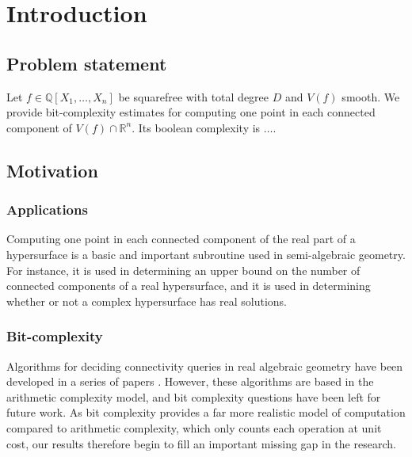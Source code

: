 \documentclass[sigconf]{acmart}
\def\R{\mathbb{R}}
\begin{document}



\maketitle
%
%
%
%
\section{Introduction}
%
\subsection{Problem statement}
%
Let $f \in \mathbb{Q}[X_1,\hdots,X_n]$ be squarefree with total degree $D$ and $V(f)$ smooth. We provide bit-complexity estimates for computing one point in each connected component of $V(f)\cap \R^n.$ Its boolean complexity is $\hdots$.
%
\subsection{Motivation}
%
\subsubsection{Applications}
%
Computing one point in each connected component of the real part of a hypersurface is a basic and important subroutine used in semi-algebraic geometry. For instance, it is used in determining an upper bound on the number of connected components of a real hypersurface, and it is used in determining whether or not a complex hypersurface has real solutions. 
\subsubsection{Bit-complexity}
Algorithms for deciding connectivity queries in real algebraic geometry have been developed in a series of papers \cite{a,b,c,d}. However, these algorithms are based in the arithmetic complexity model, and bit complexity questions have been left for future work. As bit complexity provides a far more realistic model of computation compared to arithmetic complexity,  which only counts each operation at unit cost, our results therefore begin to fill an important missing gap in the research. 
\end{document}
